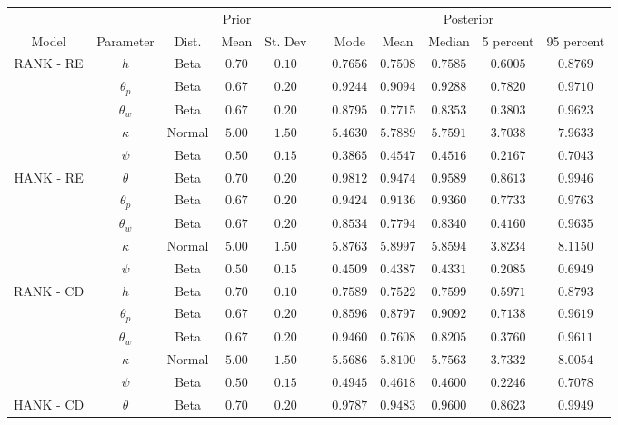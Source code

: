 \begin{table} 
\centering 
\begin{tabular}{|cc|ccc|c|ccccc|} \hline 
& & \multicolumn{3}{|c|}{Prior} & & \multicolumn{5}{|c|}{Posterior} \\ 
Model & Parameter & Dist. & Mean & St. Dev & & Mode & Mean & Median &  5 percent & 95 percent \\ \hline 
RANK - RE & $h$ & Beta & $0.70$ & $0.10$ & & $ 0.7656$ & $ 0.7508$ & $ 0.7585$& $ 0.6005$ & $ 0.8769$ \\ 
 & $\theta_p$ & Beta & $0.67$ & $0.20$ & & $ 0.9244$ & $ 0.9094$ & $ 0.9288$& $ 0.7820$ & $ 0.9710$ \\ 
 & $\theta_w$ & Beta & $0.67$ & $0.20$ & & $ 0.8795$ & $ 0.7715$ & $ 0.8353$& $ 0.3803$ & $ 0.9623$ \\ 
 & $\kappa$ & Normal & $5.00$ & $1.50$ & & $ 5.4630$ & $ 5.7889$ & $ 5.7591$& $ 3.7038$ & $ 7.9633$ \\ 
 & $\psi$ & Beta & $0.50$ & $0.15$ & & $ 0.3865$ & $ 0.4547$ & $ 0.4516$& $ 0.2167$ & $ 0.7043$ \\ \hline 
 HANK - RE & $\theta$ & Beta & $0.70$ & $0.20$ & & $ 0.9812$ & $ 0.9474$ & $ 0.9589$& $ 0.8613$& $ 0.9946$ \\ 
 & $\theta_p$ & Beta & $0.67$ & $0.20$ & & $ 0.9424$ & $ 0.9136$ & $ 0.9360$& $ 0.7733$ & $ 0.9763$ \\ 
 & $\theta_w$ & Beta & $0.67$ & $0.20$ & & $ 0.8534$ & $ 0.7794$ & $ 0.8340$& $ 0.4160$ & $ 0.9635$ \\ 
 & $\kappa$ & Normal & $5.00$ & $1.50$ & & $ 5.8763$ & $ 5.8997$ & $ 5.8594$& $ 3.8234$ & $ 8.1150$ \\ 
 & $\psi$ & Beta & $0.50$ & $0.15$ & & $ 0.4509$ & $ 0.4387$ & $ 0.4331$& $ 0.2085$ & $ 0.6949$ \\ \hline 
 RANK - CD & $h$ & Beta & $0.70$ & $0.10$ & & $ 0.7589$ & $ 0.7522$ & $ 0.7599$& $ 0.5971$ & $ 0.8793$ \\ 
 & $\theta_p$ & Beta & $0.67$ & $0.20$ & & $ 0.8596$ & $ 0.8797$ & $ 0.9092$& $ 0.7138$ & $ 0.9619$ \\ 
 & $\theta_w$ & Beta & $0.67$ & $0.20$ & & $ 0.9460$ & $ 0.7608$ & $ 0.8205$& $ 0.3760$ & $ 0.9611$ \\ 
 & $\kappa$ & Normal & $5.00$ & $1.50$ & & $ 5.5686$ & $ 5.8100$ & $ 5.7563$& $ 3.7332$ & $ 8.0054$ \\ 
 & $\psi$ & Beta & $0.50$ & $0.15$ & & $ 0.4945$ & $ 0.4618$ & $ 0.4600$& $ 0.2246$ & $ 0.7078$ \\ \hline 
 HANK - CD & $\theta$ & Beta & $0.70$ & $0.20$ & & $ 0.9787$ & $ 0.9483$ & $ 0.9600$& $ 0.8623$& $ 0.9949$ \\ 

\end{tabular}
\end{table}
